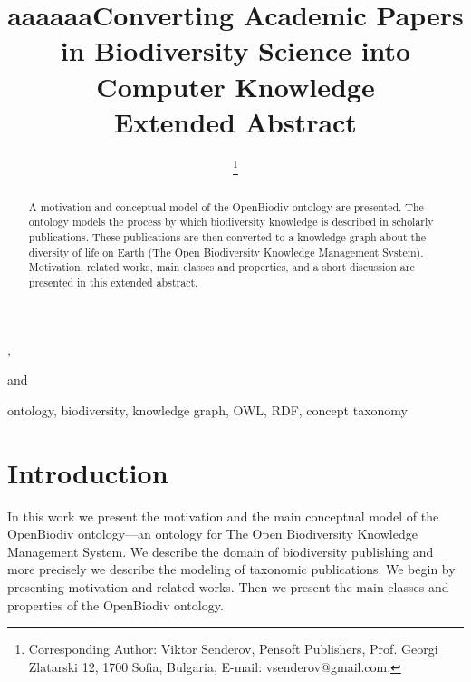 \documentclass{IOS-Book-Article}
\def\hb{\hbox to 10.7 cm{}}
\begin{document}
\def\thepage{}

\begin{frontmatter}              %


\title{aaaaaaConverting Academic Papers in Biodiversity Science into Computer Knowledge\\\textbf{ {\normalsize Extended Abstract}}}


\author[A,B]{ %
\thanks{Corresponding Author: Viktor Senderov, Pensoft Publishers, Prof. Georgi Zlatarski 12, 1700 Sofia, Bulgaria, E-mail: vsenderov@gmail.com.}},
\author[B]{ }
and 
\author[A,B]{ } 

\address[A]{Pensoft Publishers, Sofia, Bulgaria}
\address[B]{Bulgarian Academy of Sciences, Sofia, Bulgaria}

\begin{abstract}
A motivation and conceptual model of the OpenBiodiv ontology are presented. The ontology models the process by which biodiversity knowledge is described in scholarly publications. These publications are then converted to a knowledge graph about the diversity of life on Earth (The {Open} {Biodiversity} {Knowledge} {Management} {System}). Motivation, related works, main classes and properties, and a short discussion are presented in this extended abstract.
\end{abstract}

\begin{keyword}
ontology, biodiversity, knowledge graph, OWL, RDF, concept taxonomy
\end{keyword}
\end{frontmatter}
\markboth{July 2017\hb}{July 2017\hb}

\section{Introduction}

In this work we present the motivation and the main conceptual model of the OpenBiodiv ontology---an ontology for The {Open} {Biodiversity} {Knowledge} {Management} {System}. We describe the domain of biodiversity publishing and more precisely we describe the modeling of taxonomic publications. We begin by presenting motivation and related works. Then we present the main classes and properties of the OpenBiodiv ontology.
\end{document}
